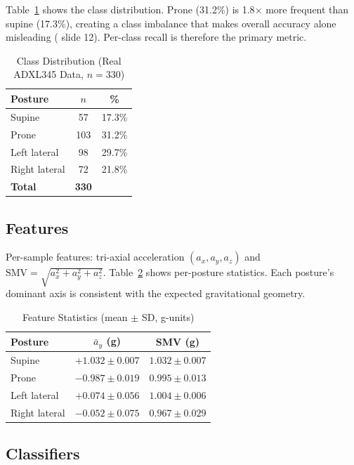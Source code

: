 \documentclass[journal]{IEEEtran}
\begin{document}
Table~\ref{tab:distribution} shows the class distribution. Prone (31.2\%) is 1.8$\times$
more frequent than supine (17.3\%), creating a class imbalance that makes overall accuracy
alone misleading ( slide 12). Per-class recall is therefore the primary metric.

\begin{table}[h]
\centering
\caption{Class Distribution (Real ADXL345 Data, $n=330$)}
\label{tab:distribution}
\begin{tabular}{lcc}
\toprule
\textbf{Posture} & \textbf{$n$} & \textbf{\%} \\
\midrule
Supine        &  57 & 17.3\% \\
Prone         & 103 & 31.2\% \\
Left lateral  &  98 & 29.7\% \\
Right lateral &  72 & 21.8\% \\
\midrule
\textbf{Total} & \textbf{330} & \\
\bottomrule
\end{tabular}
\end{table}

\subsection{Features}

Per-sample features: tri-axial acceleration $(a_x, a_y, a_z)$ and
$\text{SMV} = \sqrt{a_x^2+a_y^2+a_z^2}$. Table~\ref{tab:features} shows
per-posture statistics. Each posture's dominant axis is consistent with the
expected gravitational geometry.

\begin{table}[h]
\centering
\caption{Feature Statistics (mean $\pm$ SD, g-units)}
\label{tab:features}
\begin{tabular}{lcc}
\toprule
\textbf{Posture} & \textbf{$\bar{a}_y$ (g)} & \textbf{SMV (g)} \\
\midrule
Supine        & $+1.032\pm0.007$ & $1.032\pm0.007$ \\
Prone         & $-0.987\pm0.019$ & $0.995\pm0.013$ \\
Left lateral  & $+0.074\pm0.056$ & $1.004\pm0.006$ \\
Right lateral & $-0.052\pm0.075$ & $0.967\pm0.029$ \\
\bottomrule
\end{tabular}
\end{table}

\subsection{Classifiers}
\end{document}
